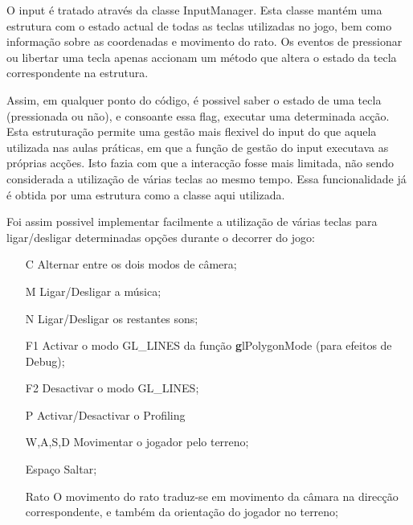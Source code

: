 O input é tratado através da classe InputManager. Esta classe mantém uma estrutura com o estado actual de todas as teclas utilizadas no jogo, bem como informação sobre as coordenadas e movimento do rato. Os eventos de pressionar ou libertar uma tecla apenas accionam um método que altera o estado da tecla correspondente na estrutura.

Assim, em qualquer ponto do código, é possivel saber o estado de uma tecla (pressionada ou não), e consoante essa flag, executar uma determinada acção. Esta estruturação permite uma gestão mais flexivel do input do que aquela utilizada nas aulas práticas, em que a função de gestão do input executava as próprias acções. Isto fazia com que a interacção fosse mais limitada, não sendo considerada a utilização de várias teclas ao mesmo tempo. Essa funcionalidade já é obtida por uma estrutura como a classe aqui utilizada.

Foi assim possivel implementar facilmente a utilização de várias teclas para ligar/desligar determinadas opções durante o decorrer do jogo:
\begin{itemize}
\item[C] Alternar entre os dois modos de câmera;
\item[M] Ligar/Desligar a música;
\item[N] Ligar/Desligar os restantes sons;
\item[F1] Activar o modo GL\_LINES da função {\textbf glPolygonMode} (para efeitos de Debug);
\item[F2] Desactivar o modo GL\_LINES;
\item[P] Activar/Desactivar o Profiling
\item[W,A,S,D] Movimentar o jogador pelo terreno;
\item[Espaço] Saltar;
\item[Rato] O movimento do rato traduz-se em movimento da câmara na direcção correspondente, e também da orientação do jogador no terreno;
\end{itemize}
